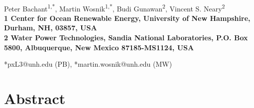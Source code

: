 \documentclass[10pt,letterpaper]{article}
\date{}
\begin{document}
\linenumbers
\vspace*{0.35in}

\begin{flushleft}

{\Large \textbf{}} \newline %
\\ Peter Bachant\textsuperscript{1,*}, Martin Wosnik\textsuperscript{1,*}, Budi
Gunawan\textsuperscript{2}, Vincent S. Neary\textsuperscript{2} \\ \bigskip
\bf{1} Center for Ocean Renewable Energy, University of New Hampshire, Durham,
NH, 03857, USA \\ \bf{2} Water Power Technologies, Sandia National Laboratories, P.O.
Box 5800, Albuquerque, New Mexico 87185-MS1124, USA \\ \bigskip

*pxL3@unh.edu (PB), *martin.wosnik@unh.edu (MW) 

\end{flushleft}

\section*{Abstract}
\end{document}
